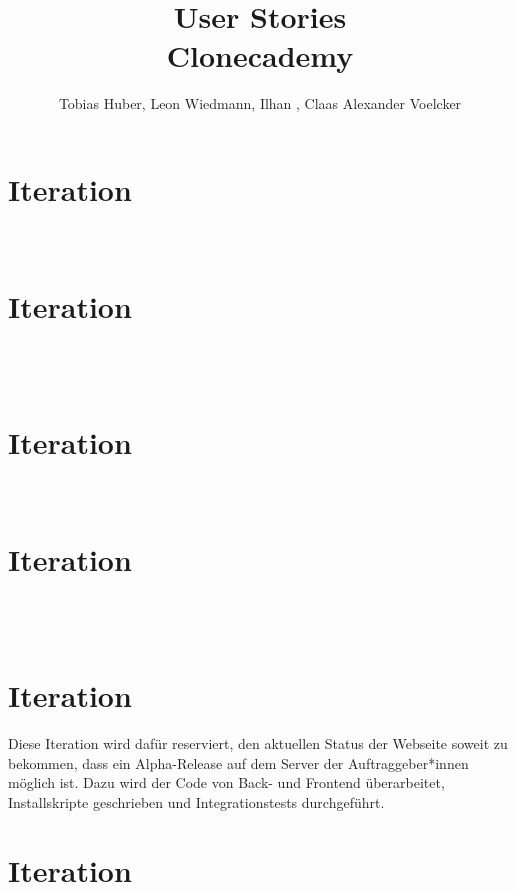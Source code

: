 \documentclass
[english,accentcolor=tud1c]
{tudreport}
\title{User Stories\\Clonecademy}
\author{Tobias Huber, Leon Wiedmann, Ilhan , Claas Alexander Voelcker}
\begin{document}

	\maketitle

	\chapter{Iteration}

	 \\
	


	\chapter{Iteration}

	 \\
	 \\
	


	\chapter{Iteration}

	 \\
	


	\chapter{Iteration}

	\\
	\\
	

	\chapter{Iteration}

	Diese Iteration wird dafür reserviert, den aktuellen Status der Webseite soweit zu bekommen, dass ein Alpha-Release auf dem Server der Auftraggeber*innen möglich ist. Dazu wird der Code von Back- und Frontend überarbeitet, Installskripte geschrieben und Integrationstests durchgeführt.

	\chapter{Iteration}
	\\
	
\end{document}
